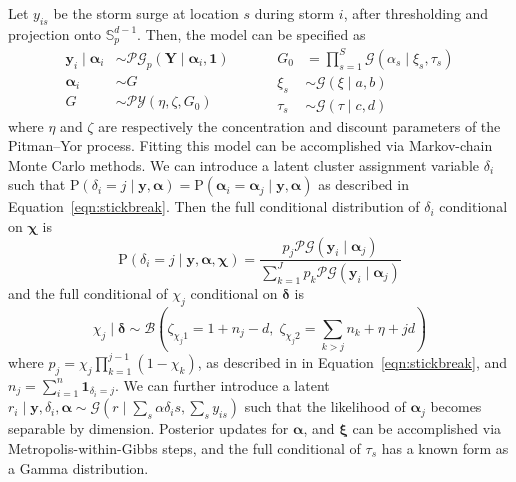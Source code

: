 Let $y_{is}$ be the storm surge at location $s$ during storm $i$, after thresholding and projection 
    onto $\mathbb{S}_p^{d-1}$.  Then, the model can be specified as
    \begin{equation}
        \label{eqn:pypg}
        \begin{aligned}
            \bm{y}_i \mid \bm{\alpha}_i &\sim
                \mathcal{PG}_p\left(\bm{Y}\mid\bm{\alpha}_i,\bm{1}\right)\\
            \bm{\alpha}_i &\sim G\\
            G &\sim \mathcal{PY}\left(\eta, \zeta, G_0\right)        
        \end{aligned}
        ~\hspace{1cm}
        \begin{aligned}
            G_0 &= {\textstyle\prod}_{s = 1}^{S}\mathcal{G}(\alpha_{s}\mid \xi_{s},\tau_{s})\\
            \xi_{s} &\sim \mathcal{G}(\xi\mid a, b)\\
            \tau_{s} &\sim \mathcal{G}(\tau\mid c, d)
        \end{aligned} 
    \end{equation}
    where $\eta$ and $\zeta$ are respectively the concentration and discount parameters
    of the Pitman--Yor process.  Fitting this model can be accomplished via Markov-chain 
    Monte Carlo methods. We can introduce a latent cluster assignment variable $\delta_i$ 
    such that 
    $\text{P}\left(\delta_i = j\mid\bm{y},\bm{\alpha}\right) = 
        \text{P}\left(\bm{\alpha}_i = \bm{\alpha}_j\mid \bm{y},\bm{\alpha}\right)$ as described in 
        Equation~\eqref{eqn:stickbreak}.
    Then the full conditional distribution of $\delta_i$ conditional on $\bm{\chi}$ is
    \begin{equation}
        \label{eqn:pdelta}
        \text{P}\left(\delta_i = j\mid \bm{y},\bm{\alpha},\bm{\chi}\right) = 
            \frac{p_j\mathcal{PG}(\bm{y}_i\mid\bm{\alpha}_j)}{
                \sum_{k = 1}^J p_k\mathcal{PG}(\bm{y}_i\mid\bm{\alpha}_j)}
    \end{equation}
    and the full conditional of $\chi_j$ conditional on $\bm{\delta}$ is
    \begin{equation}
        \label{eqn:pchi}
            \chi_j\mid\bm{\delta} \sim \mathcal{B}\left(\zeta_{\chi_j 1} = 1 + n_j - d,\; 
                            \zeta_{\chi_j 2} = {\textstyle \sum}_{k>j} n_k + \eta + jd\right)
    \end{equation}
    where $p_j = \chi_j\prod_{k=1}^{j-1}(1 - \chi_k)$,  as described in in 
    Equation~\eqref{eqn:stickbreak}, and $n_j = \sum_{i = 1}^n\bm{1}_{\delta_i = j}$.
    We can further introduce a latent $r_i\mid \bm{y}, \delta_i,\bm{\alpha} \sim 
        \mathcal{G}\left(r\mid \sum_s \alpha{\delta_is},\sum_s y_{is}\right)$ such that the
    likelihood of $\bm{\alpha}_j$ becomes separable by dimension.  Posterior updates 
    for $\bm{\alpha}$, and $\bm{\xi}$ can be accomplished via Metropolis-within-Gibbs steps,
    and the full conditional of $\tau_s$ has a known form as a Gamma distribution.

